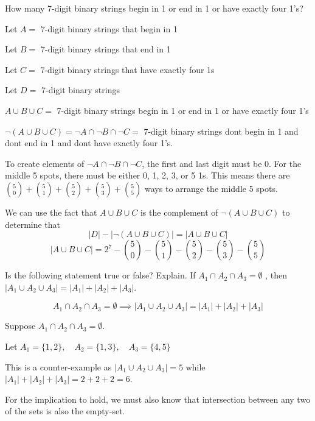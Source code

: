 \documentclass[openany, 11pt]{book}
\begin{document}
\begin{exercise}{}{}
	How many 7-digit binary strings begin in 1 or end in 1 or have exactly four 1's?
	\begin{alist}
		\item Let $A=$ 7-digit binary strings that begin in 1
		\item Let $B=$ 7-digit binary strings that end in 1
		\item Let $C=$ 7-digit binary strings that have exactly four 1s
		\item Let $D=$ 7-digit binary strings
		\item $A\cup B \cup C=$ 7-digit binary strings begin in 1 or end in 1 or have exactly four 1's
		\item $\neg(A\cup B \cup C)=\neg A \cap \neg B \cap \neg C=$
		7-digit binary strings dont begin in 1 and dont end in 1 and dont have
		exactly four 1's.
		\item To create elements of $\neg A \cap \neg B \cap \neg C$,
		the first and last digit must be 0. For the middle 5 spots, there must
		be either 0, 1, 2, 3, or 5 1s. This means there are
		$\binom{5}{0}+\binom{5}{1}+\binom{5}{2}+\binom{5}{3}+\binom{5}{5}$ ways
		to arrange the middle 5 spots.
		\item We can use the fact that $A\cup B \cup C$ is the complement of
		$\neg(A\cup B \cup C)$ to determine that
		$$|D| - |\neg(A\cup B \cup C)|=| A\cup B \cup C |$$
		$$ | A\cup B \cup C | = 2^7 - \binom{5}{0}-\binom{5}{1}-\binom{5}{2}-\binom{5}{3}-\binom{5}{5}$$
	\end{alist}
\end{exercise}

\begin{exercise}{}{}
	Is the following statement true or false? Explain. If
	$A_1
		\cap A_2 \cap A_3 =\emptyset$ , then $|A_1 \cup A_2 \cup A_3| =
		|A_1|+|A_2|+|A_3|$.

	\begin{alist}
		\item
		$$
			A_1 \cap A_2 \cap A_3 =\emptyset
			\implies
			|A_1 \cup A_2 \cup A_3| = |A_1|+|A_2|+|A_3|
		$$
		\item Suppose $A_1 \cap A_2 \cap A_3 =\emptyset$.
		\item Let
		$A_1=\{1, 2\},\quad
			A_2=\{1, 3\},\quad
			A_3=\{4, 5\} $
		\item This is a counter-example as $|A_1 \cup A_2 \cup A_3|=5$ while
		$|A_1|+|A_2|+|A_3| = 2 +2 +2=6$.
		\item For the implication to hold, we must also know that intersection between
		any two of the sets is also the empty-set.
	\end{alist}
\end{exercise}
\end{document}
